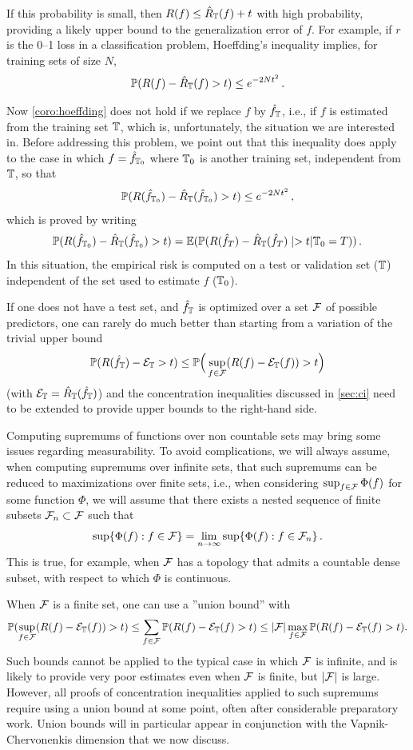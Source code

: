 If this probability is small, then $R(f) \leq \hat R_{{\mathbb T}}(f) + t$ with high probability, providing a likely upper bound to the generalization error of $f$. For example, if $r$ is the 0--1 loss in a classification problem, Hoeffding's inequality implies, for training sets of size $N$, 
\[
\bm{\mathbb P}(R(f) - \hat R_{\mathbb T}(f) > t) \leq e^{-2Nt^2}\,.
\]

Now  \cref{coro:hoeffding} does not hold if we replace $f$ by ${\hat{f}}_{\mathbb T}$, i.e., if $f$ is estimated from the training set ${\mathbb T}$, which is, unfortunately, the situation we are interested in. Before addressing this problem, we point out that this inequality does apply to the case in which $f = {\hat{f}}_{{\mathbb T}_0}$ where ${\mathbb T}_0$ is another training set, independent from ${\mathbb T}$, so that
\[
\bm{\mathbb P}(R({\hat{f}}_{{\mathbb T}_0}) - \hat R_{\mathbb T}({\hat{f}}_{{\mathbb T}_0}) > t) \leq e^{-2Nt^2}\,, 
\]
which is proved by writing
\[
\bm{\mathbb P}( R({\hat{f}}_{{\mathbb T}_0}) - \hat R_{\mathbb T}({\hat{f}}_{{\mathbb T}_0}) > t) = \bm{\mathbb E}(\bm{\mathbb P}(R({\hat{f}}_{T})-\hat R_{\mathbb T}({\hat{f}}_{T})\mid > t|{\mathbb T}_0 = T))\,.
\]
In this situation, the empirical risk is computed on a test or validation set (${\mathbb T}$) independent of the set used to estimate $f$ (${\mathbb T}_0$).


If one does not have a test set, and ${\hat{f}}_{\mathbb T}$ is optimized over a set ${\mathcal F}$ of possible predictors, one can rarely do much better than starting from  a variation of the trivial upper bound 
\[
\bm{\mathbb P}(R({\hat{f}}_{\mathbb T}) - {\mathcal E}_{\mathbb T} > t) \leq \bm{\mathbb P}\Big(\sup_{f\in {\mathcal F}} (R(f) - {\mathcal E}_{\mathbb T}(f)) > t\Big)
\]
(with ${\mathcal E}_{\mathbb T} = \hat R_{\mathbb T}({\hat{f}}_{\mathbb T})$) and the concentration inequalities discussed in  \cref{sec:ci} need to be extended to provide upper bounds to the right-hand side. 
\begin{remark}
\label{rem:measurability}
 Computing supremums of functions over non countable sets may bring some issues regarding measurability.
To avoid complications, we will always assume, when computing supremums over infinite 
 sets, that such supremums can be reduced to maximizations over finite sets, i.e., 
when considering $\sup_{f\in{\mathcal F}} \Phi(f)$ for some function $\Phi$, we will assume that there exists a nested sequence of finite subsets ${\mathcal F}_n\subset{\mathcal F}$ such that
\begin{equation}
\label{eq:measurability}
\sup\{\Phi(f): f\in {\mathcal F}\}  = \lim_{n\to\infty} \sup\{\Phi(f): f\in {\mathcal F}_n\}\,.
\end{equation}
This is true, for example, when ${\mathcal F}$ has a topology that admits a countable dense subset, with respect to which $\Phi$ is continuous.
\end{remark}

When ${\mathcal F}$ is a finite set, one can use a ''union bound'' with
\[
\bm{\mathbb P}(\sup_{f\in {\mathcal F}} (R(f) - {\mathcal E}_{\mathbb T}(f)) > t) \leq \sum_{f\in{\mathcal F}} \bm{\mathbb P}(R(f) - {\mathcal E}_{\mathbb T}(f) > t) \leq |{\mathcal F}| \max_{f\in {\mathcal F}} \bm{\mathbb P}(R(f) - {\mathcal E}_{\mathbb T}(f) > t).
\]
Such bounds cannot be applied to the typical case in which ${\mathcal F}$ is infinite, and is likely to provide very poor estimates even when ${\mathcal F}$ is finite, but $|{\mathcal F}|$ is large. 
However, all proofs of concentration inequalities applied to such supremums require using a union bound at some point, often after considerable preparatory work. Union bounds will in particular appear in conjunction with  the Vapnik-Chervonenkis dimension that we now discuss.

